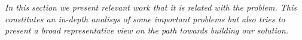 
\label{cap:chapter3}

\textit{In this section we present relevant work that it is related with the problem. This constitutes an in-depth analisys of some important problems but also tries to present a broad representative view on the path towards building our solution.}




\cleardoublepage
